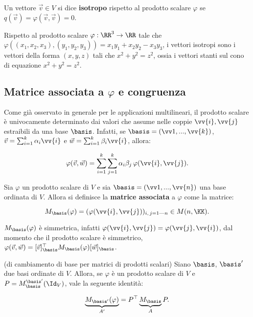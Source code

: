 \begin{definition}
	Un vettore $\vec{v} \in V$ si dice \textbf{isotropo} rispetto al prodotto scalare $\varphi$ se $q(\vec{v}) =
	\varphi(\vec{v}, \vec{v}) = 0$.
\end{definition}

\begin{example}
	Rispetto al prodotto scalare $\varphi : \RR^3 \to \RR$ tale che $\varphi((x_1, x_2, x_3), (y_1, y_2, y_3)) =
	x_1 y_1 + x_2 y_2 - x_3 y_3$, i vettori isotropi sono i vettori della forma $(x, y, z)$ tali che $x^2 + y^2 = z^2$, ossia
	i vettori stanti sul cono di equazione $x^2 + y^2 = z^2$.
\end{example}

\subsection{Matrice associata a \texorpdfstring{$\varphi$}{φ} e congruenza}

\begin{remark}
	Come già osservato in generale per le applicazioni multilineari, il prodotto scalare è univocamente determinato
	dai valori che assume nelle coppie $\vv{i}, \vv{j}$ estraibili da una base $\basis$. Infatti, se
	$\basis = (\vv1, ..., \vv{k})$, $\vec{v} = \sum_{i=1}^k \alpha_i \vv{i}$ e $\vec{w} = \sum_{i=1}^k \beta_i \vv{i}$,
	allora:
	
	\[ \varphi(\vec{v}, \vec{w}) = \sum_{i=1}^k \sum_{j=1}^k \alpha_i \beta_j \, \varphi(\vv{i}, \vv{j}). \]
\end{remark}

\begin{definition}
	Sia $\varphi$ un prodotto scalare di $V$ e sia $\basis = (\vv1, ..., \vv{n})$ una base ordinata di $V$. Allora si definisce la \textbf{matrice associata}
	a $\varphi$ come la matrice:
	
	\[ M_\basis(\varphi) = (\varphi(\vv{i}, \vv{j}))_{i,\,j = 1\text{---}n} \in M(n, \KK). \] 
\end{definition}

\begin{remark}\nl
	\li $M_\basis(\varphi)$ è simmetrica, infatti $\varphi(\vv{i}, \vv{j}) = \varphi(\vv{j}, \vv{i})$,
	dal momento che il prodotto scalare è simmetrico, \\
	\li $\varphi(\vec{v}, \vec{w}) = [\vec{v}]_\basis^\top M_\basis(\varphi) [\vec{w}]_\basis$.
\end{remark}

\begin{theorem} (di cambiamento di base per matrici di prodotti scalari) Siano $\basis$, $\basis'$ due
	basi ordinate di $V$. Allora, se $\varphi$ è un prodotto scalare di $V$ e $P = M^{\basis'}_{\basis}(\Id_V)$, vale la seguente identità:
	
	\[ \underbrace{M_{\basis'}(\varphi)}_{A'} = P^\top \underbrace{M_{\basis}}_{A} P. \]
\end{theorem}

